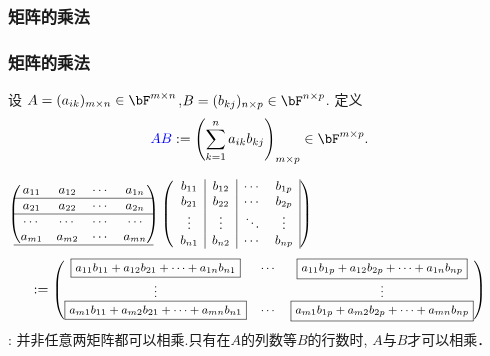 \subsubsection{矩阵的乘法}
\begin{frame}\frametitle{矩阵的乘法}
\begin{definition}[矩阵乘法]设 $A=(a_{ik})_{m\times n}\in \bF^{m\times n}$,$B=(b_{kj})_{n\times p}\in \bF^{n\times p}$. 定义
\[\blue{AB}:=\left(\sum_{k=1}^{n}a_{ik}b_{kj}\right)_{m\times p}\in \bF^{m\times p}.\]
\end{definition}
$ \small \begin{pmatrix}
a_{11}&a_{12}&\cdots&a_{1n}\\\hline
a_{21}&a_{22}&\cdots&a_{2n}\\\hline
\cdots&\cdots&\cdots&\cdots\\
a_{m1}&a_{m2}&\cdots&a_{mn}\\\hline
\end{pmatrix}
\left(\begin{array}{c|c|cc|}
b_{11}&b_{12}&\cdots&b_{1p}\\
b_{21}&b_{22}&\cdots&b_{2p}\\
\vdots&\vdots&\ddots&\vdots\\
b_{n1}&b_{n2}&\cdots&b_{np}\\
\end{array}\right) $
\begin{equation*}
\pp
\footnotesize:=
\begin{pmatrix}
\boxed{a_{11}b_{11}+a_{12}b_{21}+\cdots +a_{1n}b_{n1}} &\cdots&\boxed{a_{11}b_{1p}+a_{12}b_{2p}+\cdots +a_{1n}b_{np}}\\
\vdots& &\vdots\\
\boxed{a_{m1}b_{11}+a_{m2}b_{21}+\cdots +a_{mn}b_{n1}} &\cdots&\boxed{a_{m1}b_{1p}+a_{m2}b_{2p}+\cdots +a_{mn}b_{np}}\\
\end{pmatrix}
\pp
\end{equation*}
: 并非任意两矩阵都可以相乘.只有在$A$的列数等$B$的行数时, $A$与$B$才可以相乘．
\end{frame}





